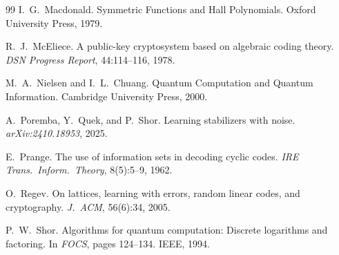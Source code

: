 \documentclass[11pt,a4paper]{article}
\theoremstyle{plain}
\theoremstyle{definition}
\begin{document}
\begin{thebibliography}{99}
I.~G.~Macdonald.
Symmetric Functions and Hall Polynomials.
Oxford University Press, 1979.

R.~J.~McEliece.
A public-key cryptosystem based on algebraic coding theory.
\emph{DSN Progress Report}, 44:114--116, 1978.

M.~A.~Nielsen and I.~L.~Chuang.
Quantum Computation and Quantum Information.
Cambridge University Press, 2000.

A.~Poremba, Y.~Quek, and P.~Shor.
Learning stabilizers with noise.
\emph{arXiv:2410.18953}, 2025.

E.~Prange.
The use of information sets in decoding cyclic codes.
\emph{IRE Trans.\ Inform.\ Theory}, 8(5):5--9, 1962.

O.~Regev.
On lattices, learning with errors, random linear codes, and cryptography.
\emph{J.\ ACM}, 56(6):34, 2005.

P.~W.~Shor.
Algorithms for quantum computation: Discrete logarithms and factoring.
In \emph{FOCS}, pages 124--134. IEEE, 1994.

\end{thebibliography}
\end{document}
